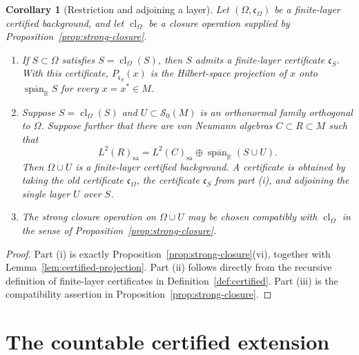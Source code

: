 \documentclass[11pt,letterpaper,reqno]{amsart}
\newtheorem{cor}[thm]{Corollary}
\theoremstyle{definition}
\numberwithin{equation}{section}
\newcommand{\sa}{\mathrm{sa}}
\newcommand{\RR}{\mathbb R}
\newcommand{\cl}{\operatorname{cl}}
\DeclareMathOperator{\spanop}{span}
\begin{document}
\begin{cor}[Restriction and adjoining a layer]\label{cor:cert-restrict-adjoin}
Let $(\Omega,\mathfrak c_\Omega)$ be a finite-layer certified background, and
let $\cl_\Omega$ be a closure operation supplied by
Proposition~\ref{prop:strong-closure}.

\begin{enumerate}[label=(\roman*)]
\item If $S\subset\Omega$ satisfies $S=\cl_\Omega(S)$, then $S$ admits a
      finite-layer certificate $\mathfrak c_S$.  With this certificate,
      $P_{\mathfrak c_S}(x)$ is the Hilbert-space projection of $x$ onto
      $\overline{\spanop_{\RR}}S$ for every $x=x^*\in M$.

\item Suppose $S=\cl_\Omega(S)$ and $U\subset\mathcal S_0(M)$ is an
      orthonormal family orthogonal to $\Omega$.  Suppose further that there
      are von Neumann algebras $C\subset R\subset M$ such that
      \[
         L^2(R)_{\sa}
         =
         L^2(C)_{\sa}\oplus
         \overline{\spanop_{\RR}}(S\cup U).
      \]
      Then $\Omega\dot\cup U$ is a finite-layer certified background.  A
      certificate is obtained by taking the old certificate
      $\mathfrak c_\Omega$, the certificate $\mathfrak c_S$ from part
      \emph{(i)}, and adjoining the single layer $U$ over $S$.

\item The strong closure operation on $\Omega\dot\cup U$ may be chosen
      compatibly with $\cl_\Omega$ in the sense of
      Proposition~\ref{prop:strong-closure}.
\end{enumerate}
\end{cor}

\begin{proof}
Part (i) is exactly Proposition~\ref{prop:strong-closure}(vi), together with
Lemma~\ref{lem:certified-projection}.  Part (ii) follows directly from the
recursive definition of finite-layer certificates in
Definition~\ref{def:certified}.  Part (iii) is the compatibility assertion in
Proposition~\ref{prop:strong-closure}.
\end{proof}











\section{The countable certified extension}\label{sec:countable-extension}
\end{document}
